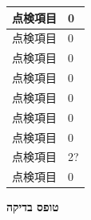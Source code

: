 \documentclass[UTF8,10pt,a4paper,fontset=fandol]{ctexart}
\newcommand{\fieldvalue}[1]{#1}
\newcommand{\handwritten}[1]{#1}
\begin{document}
\begin{tabularx}{\textwidth}{|p{}|X|p{}|}
\hline
\multicolumn{2}{|l|}{点検項目} &
\fieldvalue{\handwritten{0}} \\
\hline
\multicolumn{2}{|l|}{点検項目} &
\fieldvalue{\handwritten{0}} \\
\hline
\multicolumn{2}{|l|}{点検項目} &
\fieldvalue{\handwritten{0}} \\
\hline
\multicolumn{2}{|l|}{点検項目} &
\fieldvalue{\handwritten{0}} \\
\hline
\multicolumn{2}{|l|}{点検項目} &
\fieldvalue{\handwritten{0}} \\
\hline
\multicolumn{2}{|l|}{点検項目} &
\fieldvalue{\handwritten{0}} \\
\hline
\multicolumn{2}{|l|}{点検項目} &
\fieldvalue{\handwritten{0}} \\
\hline
\multicolumn{2}{|l|}{点検項目} &
\fieldvalue{\handwritten{2?}} \\
\hline
\multicolumn{2}{|l|}{点検項目} &
\fieldvalue{\handwritten{0}} \\
\hline
\end{tabularx}


\newpage


\begin{center}
\textbf{טופס בדיקה}
\end{center}
\end{document}
